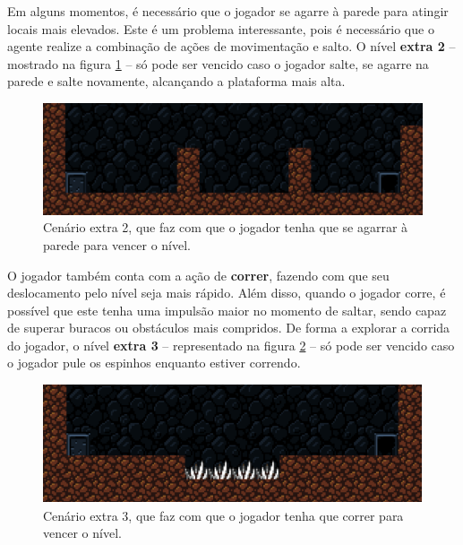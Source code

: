 Em alguns momentos, é necessário que o jogador se agarre à parede para atingir
locais mais elevados. Este é um problema interessante, pois é necessário que o
agente realize a combinação de ações de movimentação e salto. O nível
\textbf{extra 2} -- mostrado na figura \ref{fig:extra2} -- só pode ser vencido
caso o jogador salte, se agarre na parede e salte novamente, alcançando a
plataforma mais alta.

\begin{figure}[H]
\centering
\includegraphics[width=\textwidth / 2]{fig/levels/extra2.pdf}
\caption{Cenário extra 2, que faz com que o jogador tenha que se agarrar à
    parede para vencer o nível.}
\label{fig:extra2}
\end{figure}

O jogador também conta com a ação de \textbf{correr}, fazendo com que seu
deslocamento pelo nível seja mais rápido. Além disso, quando o jogador corre, é
possível que este tenha uma impulsão maior no momento de saltar, sendo capaz de
superar buracos ou obstáculos mais compridos. De forma a explorar a corrida do
jogador, o nível \textbf{extra 3} -- representado na figura \ref{fig:extra3} --
só pode ser vencido caso o jogador pule os espinhos enquanto estiver correndo.

\begin{figure}[H]
\centering
\includegraphics[width=\textwidth / 2]{fig/levels/extra3.pdf}
\caption{Cenário extra 3, que faz com que o jogador tenha que correr para
    vencer o nível.}
\label{fig:extra3}
\end{figure}
